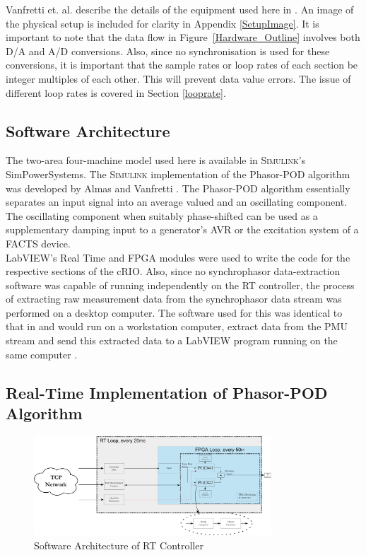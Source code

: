 \documentclass[journal]{IEEEtran}
\begin{document}
Vanfretti et. al. describe the details of the equipment used here in \cite{SmarTSLab}. An image of the physical setup is included for clarity in Appendix \ref{SetupImage}. It is important to note that the data flow in Figure~\ref{Hardware_Outline} involves both D/A and A/D conversions. Also, since no synchronisation is used for these conversions, it is important that the sample rates or loop rates of each section be integer multiples of each other. This will prevent data value errors. The issue of different loop rates is covered in Section \ref{looprate}.\\

\subsection{Software Architecture}
The two-area four-machine model used here is available in \textsc{Simulink}'s SimPowerSystems. The \textsc{Simulink} implementation of the Phasor-POD algorithm was developed by Almas and Vanfretti \cite{PhasorPODImplement}. The Phasor-POD algorithm essentially separates an input signal into an average valued and an oscillating component. The oscillating component when suitably phase-shifted can be used as a supplementary damping input to a generator's AVR or the excitation system of a FACTS device.\\

LabVIEW's Real Time and FPGA modules were used to write the code for the respective sections of the cRIO. Also,  since no synchrophasor data-extraction software was capable of running independently on the RT controller, the process of extracting raw measurement data from the synchrophasor data stream was performed on a desktop computer. The software used for this was identical to that in \cite{SDK} and would run on a workstation computer, extract data from the PMU stream and send this extracted data to a LabVIEW program running on the same computer \cite{SDK}. \\

\subsection{Real-Time Implementation of Phasor-POD Algorithm}

\begin{figure}[!th]
\centering
\includegraphics[width=3.5in]{FPGA_Block_Diagram.png} 
\caption{Software Architecture of RT Controller}
\label{RTSoftware}
\end{figure}
\end{document}
